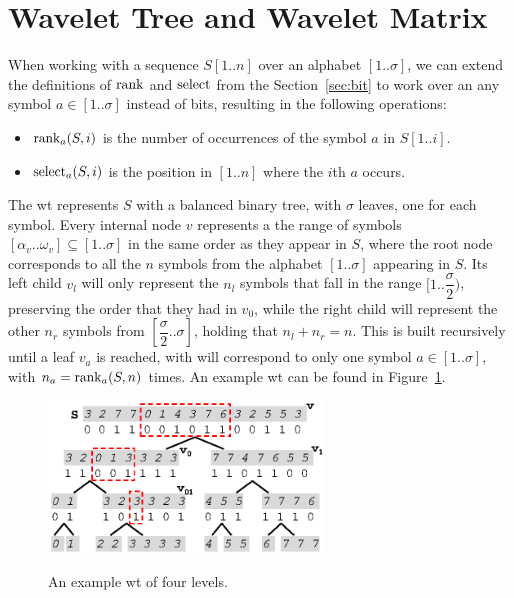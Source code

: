 \documentclass[a4paper,10pt,twoside]{book}
\begin{document}
	\section{Wavelet Tree and Wavelet Matrix}
	\label{sec:wt}
	When working with a sequence $S[1..n]$ over an alphabet $[1..\sigma]$, we can extend the definitions of $\operatorname{rank}$ and $\operatorname{select}$ from the Section~\ref{sec:bit} to work over an any symbol $a \in [1..\sigma]$ instead of bits, resulting in the following operations:
	
	\begin{itemize}
	    \item $\operatorname{rank}_a(S,i)$ is the number of occurrences of the symbol $a$ in $S[1..i]$.
	    \item $\operatorname{select}_a(S,i)$ is the position in $[1..n]$ where the $i$th $a$ occurs.
	\end{itemize}
	
    The \gls{wt} \cite{WT03} represents $S$ with a balanced binary tree, with $\sigma$ leaves, one for each symbol. Every internal node $v$ represents a the range of symbols $[\alpha_v..\omega_v] \subseteq [1..\sigma]$ in the same order as they appear in $S$, where the root node corresponds to all the $n$ symbols from the alphabet $[1..\sigma]$ appearing in $S$. Its left child $v_l$ will only represent the $n_l$ symbols that fall in the range $[1..\dfrac{\sigma}{2})$, preserving the order that they had in $v_0$, while the right child will represent the other $n_r$ symbols from $[\dfrac{\sigma}{2}..\sigma]$, holding that $n_l+n_r=n$. This is built recursively until a leaf $v_a$ is reached, with will correspond to only one symbol $a \in [1..\sigma]$, with $n_a = \operatorname{rank}_a(S,n)$ times. An example \gls{wt} can be found in Figure~\ref{fig:wt}.
    
    \begin{figure}[ht]
		\begin{center}
			{\includegraphics[width=0.65\textwidth]{figures/wt1.eps}}
		\end{center}
		\caption{An example \acrlong{wt} of four levels.}
		\label{fig:wt}
	\end{figure}
    
\end{document}

